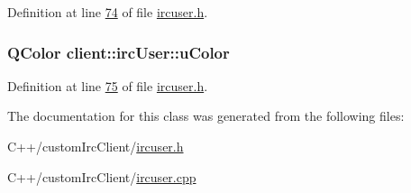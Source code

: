 Definition at line \hyperlink{custom_irc_client_2ircuser_8h_source_l00074}{74} of file \hyperlink{custom_irc_client_2ircuser_8h_source}{ircuser.\-h}.

\hypertarget{classclient_1_1irc_user_a13123b613f595f9d47bf172641be9d8a}{
\subsubsection[{u\-Color}]{\setlength{\rightskip}{0pt plus 5cm}Q\-Color client\-::irc\-User\-::u\-Color\hspace{0.3cm}{\ttfamily [private]}}}\label{d6/d69/classclient_1_1irc_user_a13123b613f595f9d47bf172641be9d8a}


Definition at line \hyperlink{custom_irc_client_2ircuser_8h_source_l00075}{75} of file \hyperlink{custom_irc_client_2ircuser_8h_source}{ircuser.\-h}.



The documentation for this class was generated from the following files\-:\begin{DoxyCompactItemize}
\item 
C++/custom\-Irc\-Client/\hyperlink{custom_irc_client_2ircuser_8h}{ircuser.\-h}\item 
C++/custom\-Irc\-Client/\hyperlink{custom_irc_client_2ircuser_8cpp}{ircuser.\-cpp}\end{DoxyCompactItemize}
